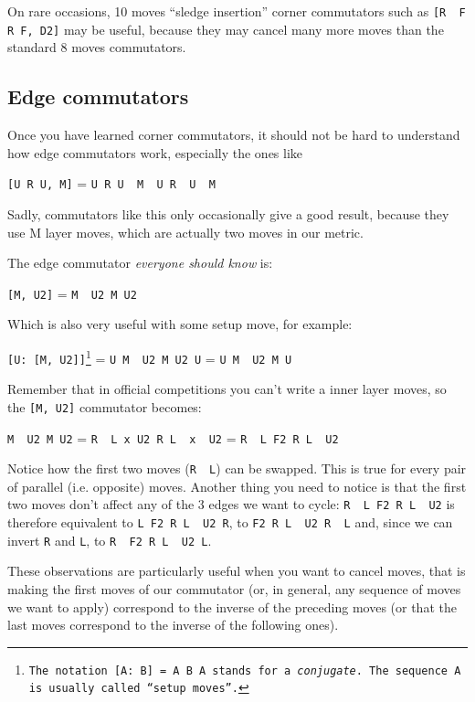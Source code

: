 \documentclass[11pt,a4paper]{book}
\newcommand{\p}{\textquotesingle}
\newcommand{\m}{\texttt}
\newcommand{\ps}{\p\,\,}
\begin{document}
On rare occasions, 10 moves ``sledge insertion'' corner commutators such as \m{[R\ps F R F\p, D2]} may be useful, because they may cancel many more moves than the standard 8 moves commutators.

\subsection{Edge commutators}

Once you have learned corner commutators, it should not be hard to understand how edge commutators work, especially the ones like

\begin{center}
\m{[U R U\p, M\p]} = \m{U R U\ps M\ps U R\ps U\ps M}
\end{center}

Sadly, commutators like this only occasionally give a good result, because they use M layer moves, which are actually two moves in our metric.

The edge commutator \emph{everyone should know} is:

\begin{center}
\m{[M\p, U2]} = \m{M\ps U2 M U2}
\end{center}

Which is also very useful with some setup move, for example:

\begin{center}
\m{[U: [M\p, U2]]\footnote{The notation \m{[A: B]} = \m{A B A\p} stands for a \emph{conjugate}. The sequence \m A is usually called ``setup moves''.}} = \m{U M\ps U2 M U2 U\p} = \m{U M\ps U2 M U}
\end{center}

Remember that in official competitions you can't write a inner layer moves, so the \m{[M\p, U2]} commutator becomes:

\begin{center}
\m{M\ps U2 M U2} = \m{R\ps L x U2 R L\ps x\ps U2} = \m{R\ps L F2 R L\ps U2}
\end{center}

Notice how the first two moves (\m{R\ps L}) can be swapped. This is true for every pair of parallel (i.e. opposite) moves.
Another thing you need to notice is that the first two moves don't affect any of the 3 edges we want to cycle: \m{R\ps L F2 R L\ps U2} is therefore equivalent to \m{L F2 R L\ps U2 R\p}, to \m{F2 R L\ps U2 R\ps L} and, since we can invert \m{R\p} and \m L, to \m{R\ps F2 R L\ps U2 L}.

These observations are particularly useful when you want to cancel moves, that is making the first moves of our commutator (or, in general, any sequence of moves we want to apply) correspond to the inverse of the preceding moves (or that the last moves correspond to the inverse of the following ones).
\end{document}
